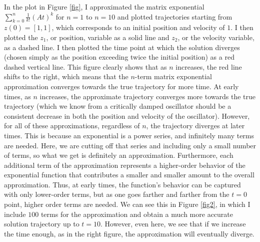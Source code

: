 \documentclass[11pt]{article}
\begin{document}
In the plot in Figure \ref{fig}, I approximated the matrix exponential $\sum_{k=0}^n \frac{1}{k!}(At)^k$ for $n = 1$ to $n = 10$ and plotted trajectories starting from $z(0) = [1,1]$, which corresponds to an initial position and velocity of $1$. I then plotted the $z_1$, or position, variable as a solid line and $z_2$, or the velocity variable, as a dashed line. I then plotted the time point at which the solution diverges (chosen simply as the position exceeding twice the initial position) as a red dashed vertical line. This figure clearly shows that as $n$ increases, the red line shifts to the right, which means that the $n$-term matrix exponential approximation converges towards the true trajectory for more time. At early times, as $n$ increases, the approximate trajectory converges more towards the true trajectory (which we know from a critically damped oscillator should be a consistent decrease in both the position and velocity of the oscillator). However, for all of these approximations, regardless of $n$, the trajectory diverges at later times. This is because an exponential is a power series, and infinitely many terms are needed. Here, we are cutting off that series and including only a small number of terms, so what we get is definitely an approximation. Furthermore, each additional term of the approximation represents a higher-order behavior of the exponential function that contributes a smaller and smaller amount to the overall approximation. Thus, at early times, the function's behavior can be captured with only lower-order terms, but as one goes farther and farther from the $t=0$ point, higher order terms are needed. We can see this in Figure \ref{fig2}, in which I include $100$ terms for the approximation and obtain a much more accurate solution trajectory up to $t = 10$. However, even here, we see that if we increase the time enough, as in the right figure, the approximation will eventually diverge.
\end{document}
